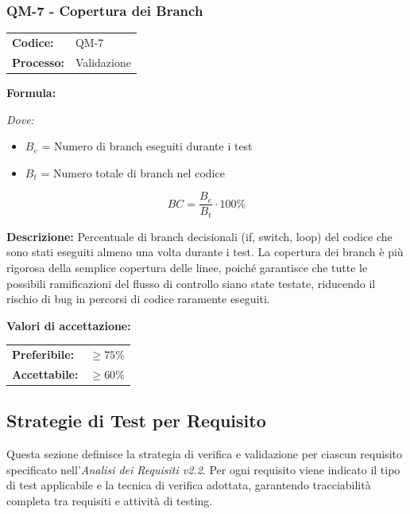 \documentclass[a4paper,11pt,oneside]{scrartcl}
\begin{document}
\subsubsection{QM-7 - Copertura dei Branch}

\noindent
\begin{tabular}{@{}p{}p{}@{}}
\textbf{Codice:} & QM-7 \\
\textbf{Processo:} & Validazione \\
\end{tabular}

\vspace{0.3cm}
\noindent\textbf{Formula:}

\noindent\textit{Dove:}
\begin{itemize}[leftmargin=1.5cm, topsep=0pt, itemsep=0pt]
    \item $B_e$ = Numero di branch eseguiti durante i test
    \item $B_t$ = Numero totale di branch nel codice
\end{itemize}

\[
BC = \frac{B_e}{B_t} \cdot 100\%
\]

\noindent\textbf{Descrizione:} Percentuale di branch decisionali (if, switch, loop) del codice che sono stati eseguiti almeno una volta durante i test. La copertura dei branch è più rigorosa della semplice copertura delle linee, poiché garantisce che tutte le possibili ramificazioni del flusso di controllo siano state testate, riducendo il rischio di bug in percorsi di codice raramente eseguiti.

\vspace{0.2cm}
\noindent\textbf{Valori di accettazione:}
\vspace{0.1cm}

\noindent
\begin{tabular}{@{}ll@{}}
\textbf{Preferibile:} & $\ge 75\%$ \\
\textbf{Accettabile:} & $\ge 60\%$ \\
\end{tabular}

\subsection{Strategie di Test per Requisito}

Questa sezione definisce la strategia di verifica e validazione per ciascun requisito specificato nell'\textit{Analisi dei Requisiti v2.2}. Per ogni requisito viene indicato il tipo di test applicabile e la tecnica di verifica adottata, garantendo tracciabilità completa tra requisiti e attività di testing{\scriptsize{}}.
\end{document}
